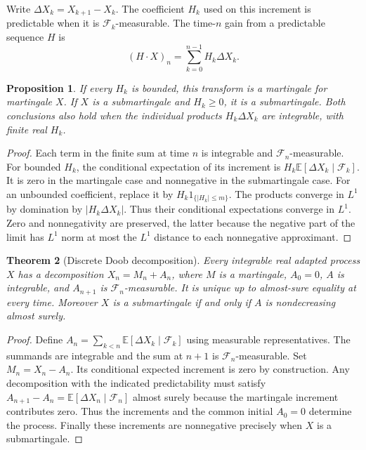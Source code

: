 \documentclass[11pt,oneside,openany]{book}
\theoremstyle{plain}
\newtheorem{theorem}{Theorem}[chapter]
\newtheorem{proposition}[theorem]{Proposition}
\theoremstyle{definition}
\theoremstyle{remark}
\begin{document}
Write \(\Delta X_k=X_{k+1}-X_k\).
The coefficient \(H_k\) used on this increment is predictable when
it is \(\mathcal F_k\)-measurable. The time-\(n\) gain from a predictable
sequence \(H\) is
\[
 (H\mathbin{\cdot}X)_n=\sum_{k=0}^{n-1}H_k\Delta X_k .
\]

\begin{proposition}
If every \(H_k\) is bounded, this transform is a martingale for
martingale \(X\). If \(X\) is a submartingale and \(H_k\ge0\), it is
a submartingale. Both conclusions also hold when the individual
products \(H_k\Delta X_k\) are integrable, with finite real \(H_k\).
\end{proposition}
\begin{proof}
Each term in the finite sum at time \(n\) is integrable and
\(\mathcal F_n\)-measurable. For bounded \(H_k\), the conditional
expectation of its increment is
\(H_k\mathbb E[\Delta X_k\mid\mathcal F_k]\). It is zero in the
martingale case and nonnegative in the submartingale case.
For an unbounded coefficient, replace it by
\(H_k1_{\{|H_k|\le m\}}\). The products converge in \(L^1\) by
domination by \(|H_k\Delta X_k|\). Thus their conditional
expectations converge in \(L^1\). Zero and nonnegativity are
preserved, the latter because the negative part of the limit has
\(L^1\) norm at most the \(L^1\) distance to each nonnegative
approximant.
\end{proof}

\begin{theorem}[Discrete Doob decomposition]
Every integrable real adapted process \(X\) has a decomposition
\(X_n=M_n+A_n\), where \(M\) is a martingale, \(A_0=0\), \(A\)
is integrable, and \(A_{n+1}\) is \(\mathcal F_n\)-measurable.
It is unique up to almost-sure equality at every time. Moreover
\(X\) is a submartingale if and only if \(A\) is nondecreasing
almost surely.
\end{theorem}
\begin{proof}
Define \(A_n=\sum_{k<n}\mathbb E[\Delta X_k\mid\mathcal F_k]\)
using measurable representatives. The summands are integrable
and the sum at \(n+1\) is \(\mathcal F_n\)-measurable. Set
\(M_n=X_n-A_n\). Its conditional expected increment is zero
by construction. Any decomposition with the indicated
predictability must satisfy
\(A_{n+1}-A_n=\mathbb E[\Delta X_n\mid\mathcal F_n]\) almost
surely because the martingale increment contributes zero.
Thus the increments and the common initial \(A_0=0\) determine
the process. Finally these increments are nonnegative precisely
when \(X\) is a submartingale.
\end{proof}
\end{document}
